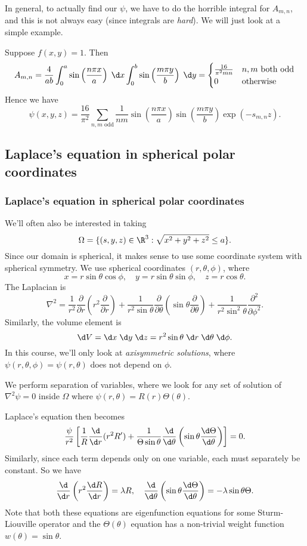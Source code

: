 \documentclass[a4paper]{article}
\begin{document}
In general, to actually find our $\psi$, we have to do the horrible integral for $A_{m, n}$, and this is not always easy (since integrals are \emph{hard}). We will just look at a simple example.
\begin{eg}
  Suppose $f(x, y) = 1$. Then
  \[
    A_{m, n} = \frac{4}{ab} \int_0^a \sin \left(\frac{n\pi x}{a}\right)\;\d x \int_0^ b \sin \left(\frac{m\pi y}{b}\right)\;\d y =
    \begin{cases}
      \frac{16}{\pi^2 mn} & n, m\text{ both odd}\\
      0 & \text{otherwise}
    \end{cases}
  \]
  Hence we have
  \[
    \psi(x, y, z) = \frac{16}{\pi^2}\sum_{n, m\text{ odd}} \frac{1}{nm}\sin\left(\frac{n\pi x}{a}\right) \sin \left(\frac{m\pi y}{b}\right) \exp(-s_{m, n}z).
  \]
\end{eg}

\subsection{Laplace's equation in spherical polar coordinates}
\subsubsection{Laplace's equation in spherical polar coordinates}

We'll often also be interested in taking
\[
  \Omega = \{(s, y, z)\in \R^3: \sqrt{x^2 + y^2 + z^2} \leq a\}.
\]
Since our domain is spherical, it makes sense to use some coordinate system with spherical symmetry. We use spherical coordinates $(r, \theta, \phi)$, where
\[
  x = r\sin \theta \cos \phi,\quad y = r\sin \theta \sin \phi,\quad z = r\cos \theta.
\]
The Laplacian is
\[
  \nabla^2 = \frac{1}{r^2}\frac{\partial}{\partial r}\left(r^2 \frac{\partial}{\partial r}\right) + \frac{1}{r^2 \sin \theta} \frac{\partial}{\partial \theta}\left(\sin \theta \frac{\partial}{\partial \theta}\right) + \frac{1}{r^2 \sin^2 \theta}\frac{\partial^2}{\partial\phi^2}.
\]
Similarly, the volume element is
\[
  \d V = \d x\;\d y\;\d z = r^2 \sin \theta \;\d r\;\d \theta \;\d \phi.
\]
In this course, we'll only look at \emph{axisymmetric solutions}, where $\psi(r, \theta, \phi) = \psi(r, \theta)$ does not depend on $\phi$.

We perform separation of variables, where we look for any set of solution of $\nabla^2 \psi = 0$ inside $\Omega$ where $\psi(r, \theta) = R(r) \Theta(\theta)$.

Laplace's equation then becomes
\[
  \frac{\psi}{r^2}\left[\frac{1}{R}\frac{\d}{\d r}(r^2 R') + \frac{1}{\Theta \sin \theta}\frac{\d}{\d \theta}\left(\sin \theta \frac{\d \Theta}{\d \theta}\right)\right] = 0.
\]
Similarly, since each term depends only on one variable, each must separately be constant. So we have
\[
  \frac{\d}{\d r}\left(r^2 \frac{\d R}{\d r}\right) = \lambda R,\quad \frac{\d}{\d \theta}\left(\sin \theta \frac{\d \Theta}{\d \theta}\right) = -\lambda \sin \theta \Theta.
\]
Note that both these equations are eigenfunction equations for some Sturm-Liouville operator and the $\Theta(\theta)$ equation has a non-trivial weight function $w(\theta) = \sin \theta$.
\end{document}
